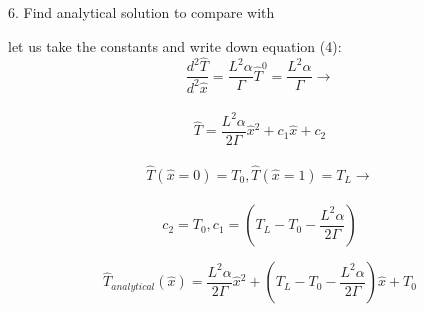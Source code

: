 \documentclass{article}      %
\begin{document}
6. Find analytical solution to compare with \\
\begin{center}
let us take the constants and write down equation (4):
$$\frac{d^2 \hat{T}}{d^{2} \hat{x}} = \frac{L^{2} \alpha}{\Gamma} \hat{T}^{0} = \frac{L^{2} \alpha}{\Gamma} \rightarrow$$ \\
$$\hat{T} = \frac{L^{2} \alpha}{2\Gamma}\hat{x}{^2} + c_{1}\hat{x} + c_{2}$$ \\
$$\hat{T}(\hat{x}=0)=T_{0}, \hat{T}(\hat{x}=1)=T_{L} \rightarrow$$ \\
$$c_{2} = T_{0}, c_{1} = (T_{L} - T_{0} - \frac{L^{2} \alpha}{2\Gamma})$$
\end{center}
\begin{equation}
\hat{T}_{analytical}(\hat{x}) = \frac{L^{2} \alpha}{2\Gamma}\hat{x}{^2} + (T_{L} - T_{0} - \frac{L^{2} \alpha}{2\Gamma})\hat{x} + T_{0}
\end{equation}
\end{document}
